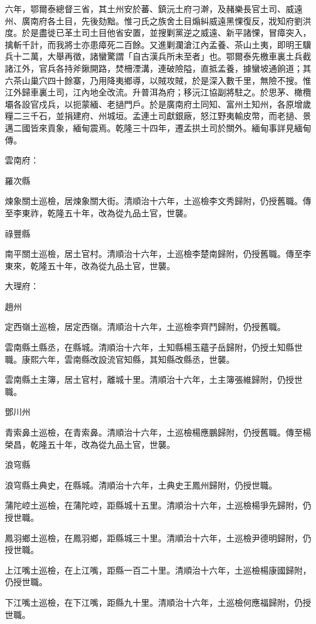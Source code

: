 \begin{pinyinscope}
六年，鄂爾泰總督三省，其土州安於蕃、鎮沅土府刁澣，及赭樂長官土司、威遠州、廣南府各土目，先後劾黜。惟刁氏之族舍土目煽糾威遠黑惈復反，戕知府劉洪度。於是盡徙已革土司土目他省安置，並搜剿黨逆之威遠、新平諸惈，冒瘴突入，擒斬千計，而我將士亦患瘴死二百餘。又進剿瀾滄江內孟養、茶山土夷，即明王驥兵十二萬，大舉再徵，諸蠻驚謂「自古漢兵所未至者」也。鄂爾泰先檄車裏土兵截諸江外，官兵各持斧鍬開路，焚柵湮溝，連破險隘，直抵孟養，據蠻坡通餉道；其六茶山巢穴四十餘寨，乃用降夷鄉導，以賊攻賊，於是深入數千里，無險不搜。惟江外歸車裏土司，江內地全改流。升普洱為府；移沅江協副將駐之。於思茅、橄欖壩各設官戍兵，以扼蒙緬、老撾門戶。於是廣南府土同知、富州土知州，各原增歲糧二三千石，並捐建府、州城垣。孟連土司獻銀廠，怒江野夷輸皮幣，而老撾、景邁二國皆來貢象，緬甸震焉。乾隆三十四年，遷孟拱土司於關外。緬甸事詳見緬甸傳。

雲南府：

羅次縣

煉象關土巡檢，居煉象關大街。清順治十六年，土巡檢李文秀歸附，仍授舊職。傳至李東祚，乾隆五十年，改為從九品土官，世襲。

祿豐縣

南平關土巡檢，居土官村。清順治十六年，土巡檢李楚南歸附，仍授舊職。傳至李東來，乾隆五十年，改為從九品土官，世襲。

大理府：

趙州

定西嶺土巡檢，居定西嶺。清順治十六年，土巡檢李齊鬥歸附，仍授舊職。

雲南縣土縣丞，在縣城。清順治十六年，土知縣楊玉蘊子岳歸附，仍授土知縣世職。康熙六年，雲南縣改設流官知縣，其知縣改縣丞，世襲。

雲南縣土主簿，居土官村，離城十里。清順治十六年，土主簿張維歸附，仍授世職。

鄧川州

青索鼻土巡檢，在青索鼻。清順治十六年，土巡檢楊應鵬歸附，仍授舊職。傳至楊榮昌，乾隆五十年，改為從九品土官，世襲。

浪穹縣

浪穹縣土典史，在縣城。清順治十六年，土典史王鳳州歸附，仍授世職。

蒲陀崆土巡檢，在蒲陀崆，距縣城十五里。清順治十六年，土巡檢楊爭先歸附，仍授世職。

鳳羽鄉土巡檢，在鳳羽鄉，距縣城三十里。清順治十六年，土巡檢尹德明歸附，仍授世職。

上江嘴土巡檢，在上江嘴，距縣一百二十里。清順治十六年，土巡檢楊康國歸附，仍授世職。

下江嘴土巡檢，在下江嘴，距縣九十里。清順治十六年，土巡檢何應福歸附，仍授世職。


\end{pinyinscope}
